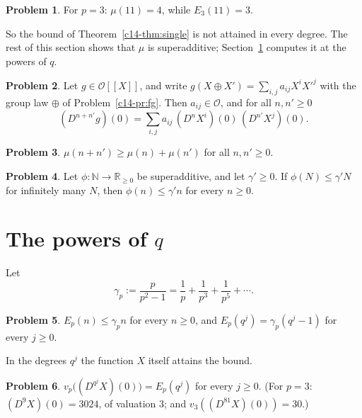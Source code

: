 \documentclass[reqno]{amsart}
\theoremstyle{definition}
\newtheorem{problem}{Problem}[section]
\theoremstyle{plain}
\newcommand{\N}{\mathbb{N}}
\newcommand{\Oc}{\mathcal{O}}
\begin{document}
\begin{problem}\label{pr:eleven}
For \(p = 3\): \(\mu(11) = 4\), while \(E_3(11) = 3\).
\end{problem}

So the bound of Theorem~\ref{c14-thm:single} is not attained in every degree.  The rest of this section shows that \(\mu\) is superadditive; Section~\ref{sec:powers} computes it at the powers of \(q\).

\begin{problem}\label{pr:split}
Let \(g \in \Oc[[X]]\), and write \(g(X \oplus X') = \sum_{i, j} a_{ij} X^i X'^j\) with the group law \(\oplus\) of Problem~\ref{c14-pr:fg}.  Then \(a_{ij} \in \Oc\), and for all \(n, n' \ge 0\)
\[
  (D^{n+n'} g)(0) = \sum_{i, j} a_{ij}\, (D^n X^i)(0)\, (D^{n'} X^j)(0) .
\]
\end{problem}

\begin{problem}\label{pr:superadditive}
\(\mu(n + n') \ge \mu(n) + \mu(n')\) for all \(n, n' \ge 0\).
\end{problem}

\begin{problem}\label{pr:fekete}
Let \(\phi \colon \N \to \mathbb{R}_{\ge 0}\) be superadditive, and let \(\gamma' \ge 0\).  If \(\phi(N) \le \gamma' N\) for infinitely many \(N\), then \(\phi(n) \le \gamma' n\) for every \(n \ge 0\).
\end{problem}

\section{The powers of \texorpdfstring{\(q\)}{q}}\label{sec:powers}

Let
\[
  \gamma_p := \frac{p}{p^2 - 1} = \frac1p + \frac1{p^3} + \frac1{p^5} + \dotsb .
\]

\begin{problem}\label{pr:Eq}
\(E_p(n) \le \gamma_p n\) for every \(n \ge 0\), and \(E_p(q^j) = \gamma_p (q^j - 1)\) for every \(j \ge 0\).
\end{problem}

In the degrees \(q^j\) the function \(X\) itself attains the bound.

\begin{problem}\label{pr:exact}
\(v_p\bigl((D^{q^j}X)(0)\bigr) = E_p(q^j)\) for every \(j \ge 0\).  (For \(p = 3\): \((D^9X)(0) = 3024\), of valuation \(3\); and \(v_3((D^{81}X)(0)) = 30\).)
\end{problem}
\end{document}
